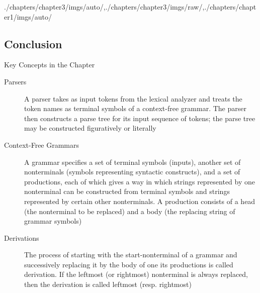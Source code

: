 \begin{graphicspathcontext}{{./chapters/chapter3/imgs/auto/},{./chapters/chapter3/imgs/raw/},{./chapters/chapter1/imgs/auto/}}
\begin{bibunit}[apalike]
\section{Conclusion}
\sectiontableofcontentslide

\begin{frame}{{Key Concepts} in the Chapter}
	\begin{small}
	\begin{description}
	\item[Parsers] A parser takes as input tokens from the lexical analyzer and treats the token names as terminal symbols of a context-free grammar. The parser then constructs a parse tree for its input sequence of tokens; the parse tree may be constructed figuratively or literally
	\item[Context-Free Grammars] A grammar specifies a set of terminal symbols (inputs), another set of nonterminals (symbols representing syntactic constructs), and a set of productions, each of which gives a way in which strings represented by one nonterminal can be constructed from terminal symbols and strings represented by certain other nonterminals. A production consists of a head (the nonterminal to be replaced) and a body (the replacing string of grammar symbols)
	\item[Derivations] The process of starting with the start-nonterminal of a grammar and successively replacing it by the body of one its productions is called derivation. If the leftmost (or rightmost) nonterminal is always replaced, then the derivation is called leftmost (resp. rightmost)
	\end{description}
\end{small}
\end{frame}


\end{bibunit}
\end{graphicspathcontext}

